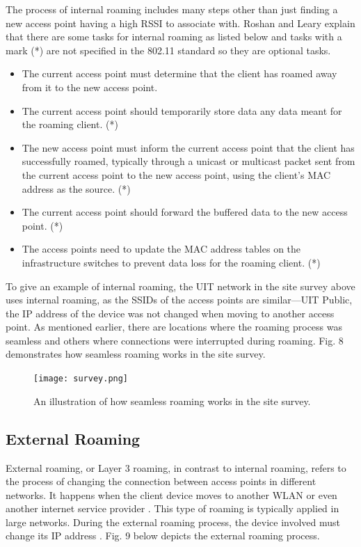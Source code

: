 \documentclass[conference]{IEEEtran}
\begin{document}
The process of internal roaming includes many steps other than just finding a new access point having a high RSSI to associate with. Roshan and Leary \cite{article_example} explain that there are some tasks for internal roaming as listed below and tasks with a mark (*) are not specified in the 802.11 standard so they are optional tasks.

\begin{itemize}
    \item The current access point must determine that the client has roamed away from it to the new access point.
    \item The current access point should temporarily store data any data meant for the roaming client. (*)
    \item The new access point must inform the current access point that the client has successfully roamed, typically through a unicast or multicast packet sent from the current access point to the new access point, using the client's MAC address as the source. (*)
    \item The current access point should forward the buffered data to the new access point. (*)
    \item The access points need to update the MAC address tables on the infrastructure switches to prevent data loss for the roaming client. (*)
\end{itemize}


To give an example of internal roaming, the UIT network in the site survey above uses internal roaming, as the SSIDs of the access points are similar—UIT Public, the IP address of the device was not changed when moving to another access point. As mentioned earlier, there are locations where the roaming process was seamless and others where connections were interrupted during roaming. Fig. 8 demonstrates how seamless roaming works in the site survey.

\begin{figure}[htbp]
    \centering
    \texttt{[image: survey.png]}
    \caption{An illustration of how seamless roaming works in the site survey.}
\end{figure}


\subsection{External Roaming}

External roaming, or Layer 3 roaming, in contrast to internal roaming, refers to the process of changing the connection between access points in different networks. It happens when the client device moves to another WLAN or even another internet service provider \cite{article_example}. This type of roaming is typically applied in large networks. During the external roaming process, the device involved must change its IP address \cite{article_example}. Fig. 9 below depicts the external roaming process.
\end{document}
